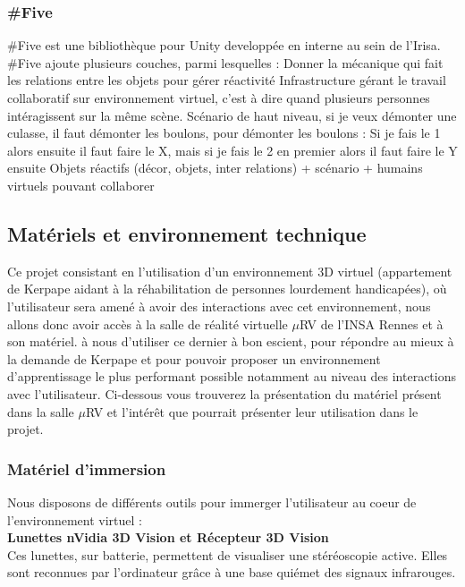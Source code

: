 	\subsubsection{\#Five}
		\#Five est une bibliothèque pour Unity developpée en interne au sein de l’Irisa. \#Five ajoute plusieurs couches, parmi lesquelles : 
		Donner la mécanique qui fait les relations entre les objets pour gérer réactivité
		Infrastructure gérant le travail collaboratif sur environnement virtuel, c'est à dire quand plusieurs personnes intéragissent sur la même scène.
		Scénario de haut niveau, si je veux démonter une culasse, il faut démonter les boulons, pour démonter les boulons : Si je fais le 1 alors ensuite il faut faire le X, mais si je fais le 2 en premier alors il faut faire le Y ensuite
		Objets réactifs (décor, objets, inter relations) + scénario + humains virtuels pouvant collaborer


\subsection{Matériels et environnement technique}

Ce projet consistant en l'utilisation d'un environnement 3D virtuel (appartement de Kerpape aidant à la réhabilitation de personnes lourdement handicapées), où l'utilisateur sera amené à avoir des interactions avec cet environnement, nous allons donc avoir accès à la salle de réalité virtuelle $\mu$RV de l'INSA Rennes et à son matériel. à nous d'utiliser ce dernier à bon escient, pour répondre au mieux à la demande de Kerpape et pour pouvoir proposer un environnement d'apprentissage le plus performant possible notamment au niveau des interactions avec l'utilisateur. 
Ci-dessous vous trouverez la présentation du matériel présent dans la salle $\mu$RV et l'intérêt que pourrait présenter leur utilisation dans le projet.

\subsubsection{Matériel d'immersion}
Nous disposons de différents outils pour immerger l'utilisateur au coeur de l'environnement virtuel : 
\\

\textbf{Lunettes nVidia 3D Vision et Récepteur 3D Vision}
\\

Ces lunettes, sur batterie, permettent de visualiser une stéréoscopie active. Elles sont reconnues par l'ordinateur grâce à une base quiémet des signaux infrarouges.
\\

